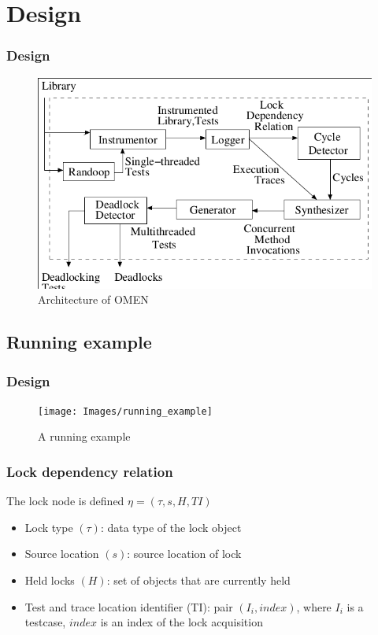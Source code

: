 \documentclass{beamer}
\begin{document}
\section{Design}
\begin{frame}
\frametitle{Design}
\begin{figure}[ht!]
     \begin{center}
%
       
      \includegraphics[scale = 0.4]{Images/design}
        
%
    \end{center}
    \caption{%
        Architecture of OMEN
     }%
   \label{fig:subfigures}
\end{figure}

\end{frame}

\subsection{Running example}
\begin{frame}
\frametitle{Design}
\begin{figure}[ht!]
     \begin{center}
%
       
      \texttt{[image: Images/running\_example]}
        
%
    \end{center}
    \caption{%
        A running example
     }%
   \label{fig:subfigures}
\end{figure}
\end{frame}

\begin{frame}
\frametitle{Lock dependency relation}
The lock node is defined $\eta = (\tau, s, H, TI) $
\begin{itemize}
\item Lock type $(\tau)$: data type of the lock object
\item Source location $(s)$: source location of lock
\item Held locks $(H)$: set of objects that are currently held
\item Test and trace location identifier (TI): pair $(I_i, index)$, where $I_i$ is a testcase, $index$ is an index of the lock acquisition
\end{itemize}
\end{frame}
\end{document}
